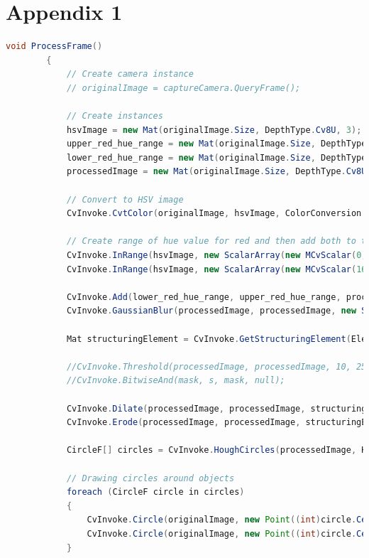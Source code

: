 \documentclass[onecolumn, draftclsnofoot,10pt, compsoc]{IEEEtran}
\begin{document}
\section{Appendix 1}
\begin{lstlisting}[language=java]
void ProcessFrame()
        {
            // Create camera instance
            // originalImage = captureCamera.QueryFrame();

            // Create instances
            hsvImage = new Mat(originalImage.Size, DepthType.Cv8U, 3);
            upper_red_hue_range = new Mat(originalImage.Size, DepthType.Cv8U, 1);
            lower_red_hue_range = new Mat(originalImage.Size, DepthType.Cv8U, 1);
            processedImage = new Mat(originalImage.Size, DepthType.Cv8U, 1);

            // Convert to HSV image
            CvInvoke.CvtColor(originalImage, hsvImage, ColorConversion.Bgr2Hsv);

            // Create range of hue value for red and then add both to the processedImage
            CvInvoke.InRange(hsvImage, new ScalarArray(new MCvScalar(0, 155, 155)), new ScalarArray(new MCvScalar(20, 255, 255)), lower_red_hue_range);
            CvInvoke.InRange(hsvImage, new ScalarArray(new MCvScalar(160, 155, 155)), new ScalarArray(new MCvScalar(179, 255, 255)), upper_red_hue_range);

            CvInvoke.Add(lower_red_hue_range, upper_red_hue_range, processedImage);
            CvInvoke.GaussianBlur(processedImage, processedImage, new Size(3, 3), 0);

            Mat structuringElement = CvInvoke.GetStructuringElement(ElementShape.Rectangle, new Size(3, 3), new Point(-1, -1));

            //CvInvoke.Threshold(processedImage, processedImage, 10, 255, ThresholdType.Binary);
            //CvInvoke.BitwiseAnd(mask, s, mask, null);

            CvInvoke.Dilate(processedImage, processedImage, structuringElement, new Point(-1, -1), 1, BorderType.Default, new MCvScalar(0, 0, 0));
            CvInvoke.Erode(processedImage, processedImage, structuringElement, new Point(-1, -1), 1, BorderType.Default, new MCvScalar(0, 0, 0));

            CircleF[] circles = CvInvoke.HoughCircles(processedImage, HoughType.Gradient, 2.0, processedImage.Rows / 4, 100, 50, 0, 0);

            // Drawing circles around objects
            foreach (CircleF circle in circles)
            {
                CvInvoke.Circle(originalImage, new Point((int)circle.Center.X, (int)circle.Center.Y), (int)circle.Radius, new MCvScalar(0, 0, 255), 2);
                CvInvoke.Circle(originalImage, new Point((int)circle.Center.X, (int)circle.Center.Y), 3, new MCvScalar(0, 255, 0), -1);
            }


\end{lstlisting}
\end{document}
